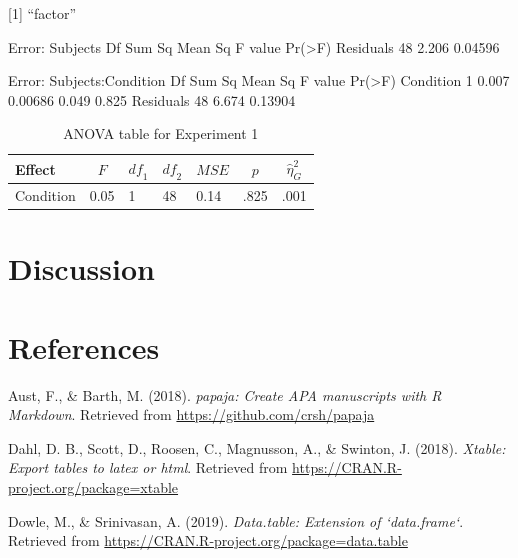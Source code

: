 \documentclass[man,floatsintext]{apa6}
\begin{document}
{[}1{]} \enquote{factor}

Error: Subjects Df Sum Sq Mean Sq F value Pr(\textgreater{}F) Residuals
48 2.206 0.04596

Error: Subjects:Condition Df Sum Sq Mean Sq F value Pr(\textgreater{}F)
Condition 1 0.007 0.00686 0.049 0.825 Residuals 48 6.674 0.13904

\begin{table}[tbp]
\begin{center}
\begin{threeparttable}
\caption{\label{tab:aovtable}ANOVA table for Experiment 1}
\begin{tabular}{lllllll}
\toprule
Effect & \multicolumn{1}{c}{$F$} & \multicolumn{1}{c}{$\mathit{df}_1$} & \multicolumn{1}{c}{$\mathit{df}_2$} & \multicolumn{1}{c}{$\mathit{MSE}$} & \multicolumn{1}{c}{$p$} & \multicolumn{1}{c}{$\hat{\eta}^2_G$}\\
\midrule
Condition & 0.05 & 1 & 48 & 0.14 & .825 & .001\\
\bottomrule
\end{tabular}
\end{threeparttable}
\end{center}
\end{table}

\section{Discussion}\label{discussion}

\newpage

\section{References}\label{references}

\begingroup
\setlength{\parindent}{-0.5in} \setlength{\leftskip}{0.5in}

\hypertarget{refs}{}
\hypertarget{ref-R-papaja}{}
Aust, F., \& Barth, M. (2018). \emph{papaja: Create APA manuscripts with
R Markdown}. Retrieved from \url{https://github.com/crsh/papaja}

\hypertarget{ref-R-xtable}{}
Dahl, D. B., Scott, D., Roosen, C., Magnusson, A., \& Swinton, J.
(2018). \emph{Xtable: Export tables to latex or html}. Retrieved from
\url{https://CRAN.R-project.org/package=xtable}

\hypertarget{ref-R-data.table}{}
Dowle, M., \& Srinivasan, A. (2019). \emph{Data.table: Extension of
`data.frame`}. Retrieved from
\url{https://CRAN.R-project.org/package=data.table}
\end{document}
